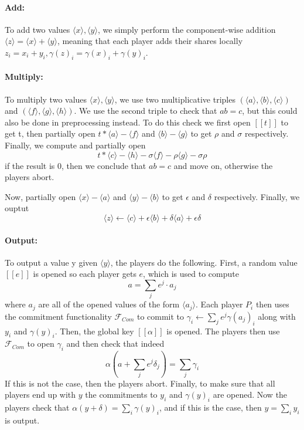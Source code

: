 \documentclass{article}
\begin{document}
\paragraph{Add:} To add two values $\langle x \rangle, \langle y \rangle$, we simply perform the component-wise addition $\langle z \rangle = \langle x \rangle + \langle y \rangle$, meaning that each player adds their shares locally $z_i = x_i + y_i, \gamma(z)_i = \gamma(x)_i + \gamma(y)_i$. %

\paragraph{Multiply:} To multiply two values $\langle x \rangle, \langle y \rangle$, we use two multiplicative triples $(\langle a \rangle, \langle b \rangle, \langle c \rangle)$ and $(\langle f \rangle, \langle g \rangle, \langle h \rangle)$. We use the second triple to check that $ab = c$, but this could also be done in preprocessing instead. To do this check we first open $[\![ t ]\!]$ to get t, then partially open $t * \langle a \rangle - \langle f \rangle$ and $\langle b \rangle - \langle g \rangle$ to get $\rho$ and $\sigma$ respectively. Finally, we compute and partially open $$t * \langle c \rangle - \langle h \rangle - \sigma \langle f \rangle - \rho \langle g \rangle - \sigma \rho$$
if the result is $0$, then we conclude that $ab = c$ and move on, otherwise the players abort.

Now, partially open $\langle x \rangle - \langle a \rangle$ and $\langle y \rangle - \langle b \rangle$ to get $\epsilon$ and $\delta$ respectively. Finally, we ouptut $$\langle z \rangle \leftarrow \langle c \rangle + \epsilon \langle b \rangle + \delta \langle a \rangle + \epsilon \delta$$

\paragraph{Output:}
To output a value y given $\langle y \rangle$, the players do the following.
First, a random value $[\![ e ]\!]$ is opened so each player gets $e$, which is used to compute $$a = \sum_j e^j \cdot a_j$$ where $a_j$ are all of the opened values of the form $\langle a_j \rangle$.
Each player $P_i$ then uses the commitment functionality $\mathcal{F}_{Com}$ to commit to $\gamma_i \leftarrow \sum_j e^j \gamma(a_j)_i$ along with $y_i$ and $\gamma(y)_i$.
Then, the global key $[\![ \alpha ]\!]$ is opened.
The players then use $\mathcal{F}_{Com}$ to open $\gamma_i$ and then check that indeed $$\alpha(a + \sum_j e^j \delta_j) = \sum_j \gamma_i$$
If this is not the case, then the players abort.
Finally, to make sure that all players end up with $y$ the commitments to $y_i$ and $\gamma(y)_i$ are opened. Now the players check that $\alpha(y + \delta) = \sum_i \gamma(y)_i$, and if this is the case, then $y = \sum_i y_i$ is output.
\end{document}
